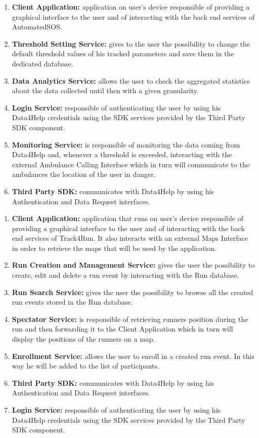 \begin{enumerate}
    \item \textbf{Client Application:} application on user's device responsible of providing a graphical interface to the user and of interacting with the back end  services of AutomatedSOS.
    \item \textbf{Threshold Setting Service:} gives to the user the possibility to change the default threshold values of his tracked parameters and save them in the dedicated database. 
    \item \textbf{Data Analytics Service:} allows the user to check the aggregated statistics about the data collected until then with a given granularity. 
    \item \textbf{Login Service:} responsible of authenticating the user by using his Data4Help credentials using the SDK services provided by the Third Party SDK component.
    \item \textbf{Monitoring Service:} is responsible of monitoring the data coming from Data4Help and, whenever a threshold is exceeded, interacting with the external Ambulance Calling Interface which in turn will communicate to the ambulances the location of the user in danger.
    \item \textbf{Third Party SDK:} communicates with Data4Help by using his Authentication and Data Request interfaces.
\end{enumerate}

\begin{enumerate}
    \item \textbf{Client Application:} application that runs on user's device responsible of providing a graphical interface to the user and of interacting with the back end services of Track4Run. It also interacts with an external Maps Interface in order to retrieve the maps that will be used by the application.
    \item \textbf{Run Creation and Management Service:} gives the user the possibility to create, edit and delete a run event by interacting with the Run database.
    \item \textbf{Run Search Service:} gives the user the possibility to browse all the created run events stored in the Run database.
    \item \textbf{Spectator Service:} is responsible of retrieving runners position during the run and then forwarding it to the Client Application which in turn will display the positions of the runners on a map.
    \item \textbf{Enrollment Service:} allows the user to enroll in a created run event. In this way he will be added to the list of participants.
    \item \textbf{Third Party SDK:} communicates with Data4Help by using his Authentication and Data Request interfaces.
    \item \textbf{Login Service:} responsible of authenticating the user by using his Data4Help credentials using the SDK services provided by the Third Party SDK component.
\end{enumerate}